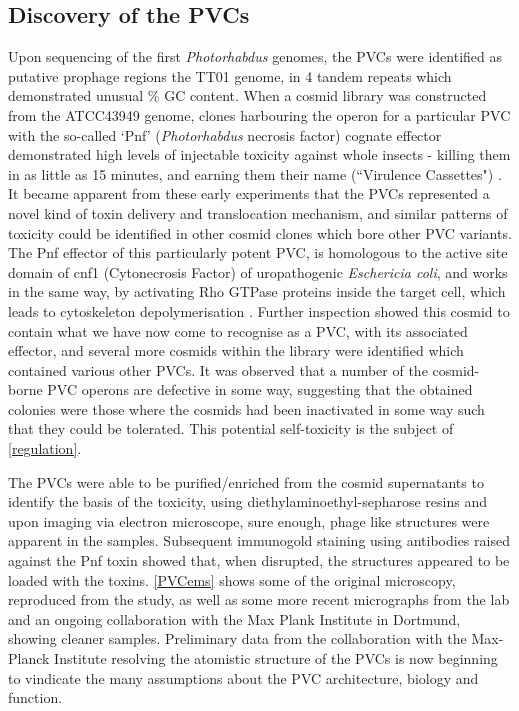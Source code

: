 \subsection{Discovery of the PVCs}
Upon sequencing of the first \emph{Photorhabdus} genomes, the PVCs were identified as putative prophage regions the \Plum{} TT01 genome, in 4 tandem repeats which demonstrated unusual \% GC content. When a cosmid library was constructed from the \Pasy{} ATCC43949 genome, clones harbouring the operon for a particular PVC with the so-called `Pnf' (\emph{Photorhabdus} necrosis factor) cognate effector demonstrated high levels of injectable toxicity against whole insects - killing them in as little as 15 minutes, and earning them their name (``Virulence Cassettes") \citep{Yang2006, Waterfield2008}. It became apparent from these early experiments that the PVCs represented a novel kind of toxin delivery and translocation mechanism, and similar patterns of toxicity could be identified in other cosmid clones which bore other PVC variants. The Pnf effector of this particularly potent PVC, is homologous to the active site domain of cnf1 (Cytonecrosis Factor) of uropathogenic \emph{Eschericia coli}, and works in the same way, by activating Rho GTPase proteins inside the target cell, which leads to cytoskeleton depolymerisation \citep{Landraud2004, Buetow2001}. Further inspection showed this cosmid to contain what we have now come to recognise as a PVC, with its associated effector, and several more cosmids within the library were identified which contained various other PVCs. It was observed that a number of the cosmid-borne PVC operons are defective in some way, suggesting that the obtained colonies were those where the cosmids had been inactivated in some way such that they could be tolerated. This potential self-toxicity is the subject of \vref{regulation}.

The PVCs were able to be purified/enriched from the cosmid supernatants to identify the basis of the toxicity, using diethylaminoethyl-sepharose resins and upon imaging via electron microscope, sure enough, phage like structures were apparent in the samples. Subsequent immunogold staining using antibodies raised against the Pnf toxin showed that, when disrupted, the structures appeared to be loaded with the toxins. \vref{PVCems} shows some of the original microscopy, reproduced from the \cite{Yang2006} study, as well as some more recent micrographs from the lab and an ongoing collaboration with the Max Plank Institute in Dortmund, showing cleaner samples. Preliminary data from the collaboration with the Max-Planck Institute resolving the atomistic structure of the PVCs is now beginning to vindicate the many assumptions about the PVC architecture, biology and function.

